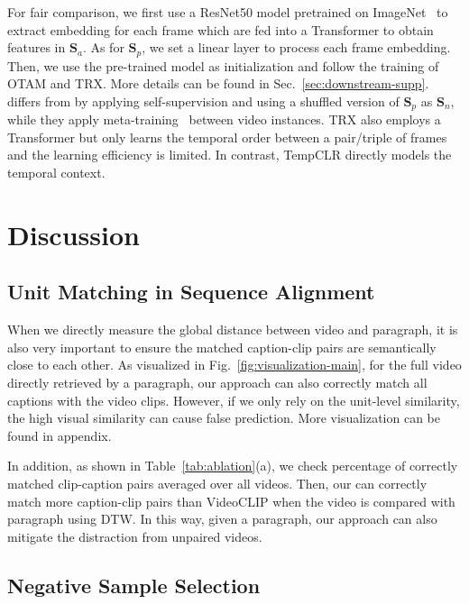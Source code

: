  For fair comparison, we first use a ResNet50 model pretrained on ImageNet~\citep{deng2009imagenet} to extract embedding for each frame which are fed into a Transformer to obtain features in $\mathbf{S}_a$. As for $\mathbf{S}_p$, we set a linear layer to process each frame embedding. Then, we use the pre-trained model as initialization and follow the training of OTAM and TRX. More details can be found in Sec.~\ref{sec:downstream-supp}. \approach{} differs from \citet{cao2020few} by applying self-supervision and using a shuffled version of $\mathbf{S}_p$ as $\mathbf{S}_n$, while they apply meta-training~\citep{snell2017prototypical} between video instances. TRX also employs a Transformer but only learns the temporal order between a pair/triple of frames and the learning efficiency is limited. In contrast, TempCLR directly models the temporal context.

\section{Discussion}\label{sec:discussion}

\subsection{Unit Matching in Sequence Alignment}\label{sec:unit-seq} 
When we directly measure the global distance between video and paragraph, it is also very important to ensure the matched caption-clip pairs are semantically close to each other.
As visualized in Fig.~\ref{fig:visualization-main}, for the full video directly retrieved by a paragraph, our approach can also correctly match all captions with the video clips. 
However, if we only rely on the unit-level similarity, the high visual similarity can cause false prediction. More visualization can be found in appendix.

In addition, as shown in Table~\ref{tab:ablation}(a), we check percentage of correctly matched clip-caption pairs averaged over all videos.
Then, our \approach{} can correctly match more caption-clip pairs than VideoCLIP when the video is compared with paragraph using DTW.
In this way, given a paragraph, our approach can also mitigate the distraction from unpaired videos.



\subsection{Negative Sample Selection}\label{sec:negative}

